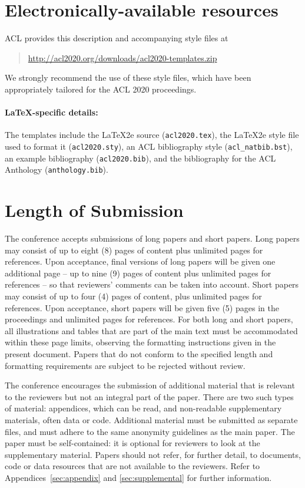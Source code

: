 \documentclass[11pt,a4paper]{article}
\begin{document}
\section{Electronically-available resources}

ACL provides this description and accompanying style files at
\begin{quote}
  \url{http://acl2020.org/downloads/acl2020-templates.zip}
\end{quote}
We strongly recommend the use of these style files, which have been appropriately tailored for the ACL 2020 proceedings.

\paragraph{\LaTeX-specific details:}
The templates include the \LaTeX2e{} source (\texttt{\small acl2020.tex}),
the \LaTeX2e{} style file used to format it (\texttt{\small acl2020.sty}),
an ACL bibliography style (\texttt{\small acl\_natbib.bst}),
an example bibliography (\texttt{\small acl2020.bib}),
and the bibliography for the ACL Anthology (\texttt{\small anthology.bib}).


\section{Length of Submission}
\label{sec:length}

The conference accepts submissions of long papers and short papers.
Long papers may consist of up to eight (8) pages of content plus unlimited pages for references.
Upon acceptance, final versions of long papers will be given one additional page -- up to nine (9) pages of content plus unlimited pages for references -- so that reviewers' comments can be taken into account.
Short papers may consist of up to four (4) pages of content, plus unlimited pages for references.
Upon acceptance, short papers will be given five (5) pages in the proceedings and unlimited pages for references.
For both long and short papers, all illustrations and tables that are part of the main text must be accommodated within these page limits, observing the formatting instructions given in the present document.
Papers that do not conform to the specified length and formatting requirements are subject to be rejected without review.

The conference encourages the submission of additional material that is relevant to the reviewers but not an integral part of the paper.
There are two such types of material: appendices, which can be read, and non-readable supplementary materials, often data or code.
Additional material must be submitted as separate files, and must adhere to the same anonymity guidelines as the main paper.
The paper must be self-contained: it is optional for reviewers to look at the supplementary material.
Papers should not refer, for further detail, to documents, code or data resources that are not available to the reviewers.
Refer to Appendices~\ref{sec:appendix} and \ref{sec:supplemental} for further information.
\end{document}
